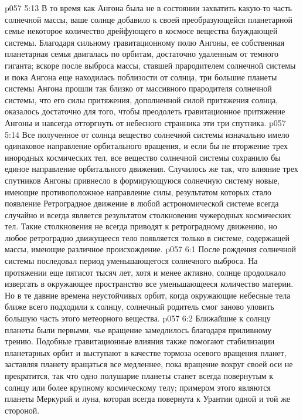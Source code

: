 \vs p057 5:13 \pc В то время как Ангона была не в состоянии захватить какую\hyp{}то часть солнечной массы, ваше солнце добавило к своей преобразующейся планетарной семье некоторое количество дрейфующего в космосе вещества блуждающей системы. Благодаря сильному гравитационному полю Ангоны, ее собственная планетарная семья двигалась по орбитам, достаточно удаленным от темного гиганта; вскоре после выброса массы, ставшей прародителем солнечной системы и пока Ангона еще находилась поблизости от солнца, три большие планеты системы Ангона прошли так близко от массивного прародителя солнечной системы, что его силы притяжения, дополненной силой притяжения солнца, оказалось достаточно для того, чтобы преодолеть гравитационное притяжение Ангоны и навсегда отторгнуть от небесного странника эти три спутника.
\vs p057 5:14 Все полученное от солнца вещество солнечной системы изначально имело одинаковое направление орбитального вращения, и если бы не вторжение трех инородных космических тел, все вещество солнечной системы сохранило бы единое направление орбитального движения. Случилось же так, что влияние трех спутников Ангоны привнесло в формирующуюся солнечную систему новые, имеющие противоположное направление силы, результатом которых стало появление  Ретроградное движение в любой астрономической системе всегда случайно и всегда является результатом столкновения чужеродных космических тел. Такие столкновения не всегда приводят к ретроградному движению, но любое ретроградно движущееся тело появляется только в системе, содержащей массы, имеющие различное происхождение.
\vs p057 6:1 После рождения солнечной системы последовал период уменьшающегося солнечного выброса. На протяжении еще пятисот тысяч лет, хотя и менее активно, солнце продолжало извергать в окружающее пространство все уменьшающееся количество материи. Но в те давние времена неустойчивых орбит, когда окружающие небесные тела ближе всего подходили к солнцу, солнечный родитель смог заново уловить большую часть этого метеорного вещества.
\vs p057 6:2 \pc Ближайшие к солнцу планеты были первыми, чье вращение замедлилось благодаря приливному трению. Подобные гравитационные влияния также помогают стабилизации планетарных орбит и выступают в качестве тормоза осевого вращения планет, заставляя планету вращаться все медленнее, пока вращение вокруг своей оси не прекратится, так что одно полушарие планеты станет всегда повернутым к солнцу или более крупному космическому телу; примером этого являются планеты Меркурий и луна, которая всегда повернута к Урантии одной и той же стороной.
